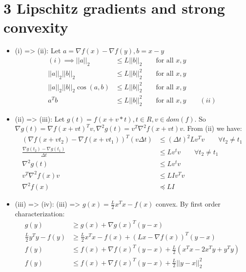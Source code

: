 \documentclass[12pt,letterpaper]{article}
\begin{document}
\section*{3 Lipschitz gradients and strong convexity}
\begin{alphalist}
\item
    \begin{itemize}
        \item (i) => (ii): Let $a = \nabla{}f(x) - \nabla{}f(y), b = x - y$
            \[
                \begin{split}
                    (i) \implies ||a||_2 &\le L ||b||_2 \qquad \text{for all } x, y\\
                    ||a||_2 ||b||_2 &\le L ||b||_2^2 \qquad \text{for all } x, y\\
                    ||a||_2 ||b||_2 \cos(a, b) &\le L ||b||_2^2 \qquad \text{for all } x, y\\
                    a^Tb &\le L ||b||_2^2 \qquad \text{for all } x, y \qquad (ii)
                \end{split}
            \]

        \item (ii) => (iii): Let $g(t) = f(x + v*t), t \in R, v \in dom(f)$.
            So $\nabla{}g(t) = \nabla{}f(x + vt)^Tv, \nabla^2g(t) = v^T\nabla^2f(x + vt)v$.
            From (ii) we have:
            \[
                \begin{split}
                    (\nabla{}f(x + vt_2) - \nabla{}f(x + vt_1))^T(v\Delta{}t) &\le (\Delta{}t)^2 Lv^Tv \qquad \forall{}t_2 \ne t_1\\
                    \frac{\nabla{}g(t_2) - \nabla{}g(t_1)}{\Delta{}t} &\le Lv^tv  \qquad \forall{}t_2 \ne t_1\\
                    \nabla^2g(t) &\le Lv^tv \\
                    v^T\nabla^2f(x)v &\le LIv^Tv \\
                    \nabla^2f(x) &\preceq LI
                \end{split}
            \]

        \item (iii) => (iv): (iii) => $g(x) = \frac{L}{2}x^Tx - f(x)$ convex.
            By first order characterization:
            \[
                \begin{split}
                    g(y) &\ge g(x) + \nabla{}g(x)^T(y - x) \\
                    \frac{L}{2}y^Ty - f(y) &\ge \frac{L}{2}x^Tx - f(x) + (Lx - \nabla{}f(x))^T(y - x)\\
                    f(y) &\le f(x) + \nabla{}f(x)^T(y - x) + \frac{L}{2}(x^Tx - 2x^Ty + y^Ty)\\
                    f(y) &\le f(x) + \nabla{}f(x)^T(y - x) + \frac{L}{2}||y - x||_2^2
                \end{split}
            \]
    \end{itemize}

\item
\end{alphalist}
\end{document}
